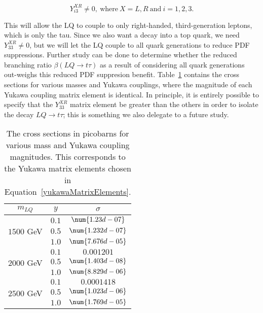         \begin{equation}
            Y^{XR}_{i3} \neq 0,\ \text{where}\ X=L,R\ \text{and}\ i=1,2,3.
        \end{equation}\label{yukawaMatrixElements}

         This will allow the LQ to couple to only right-handed, third-generation leptons, which is only the tau. Since we also want a decay into a top quark, we need $Y^{XR}_{33} \neq 0$, but we will let the LQ couple to all quark generations to reduce PDF suppressions. Further study can be done to determine whether the reduced branching ratio $\beta(LQ \rightarrow t\tau)$ as a result of considering all quark generations out-weighs this reduced PDF suppresion benefit. Table~\ref{crossSections} contains the cross sections for various masses and Yukawa couplings, where the magnitude of each Yukawa coupling matrix element is identical. In principle, it is entirely possible to specify that the $Y^{XR}_{33}$ matrix element be greater than the others in order to isolate the decay $LQ \rightarrow t\tau$; this is something we also delegate to a future study.

        \renewcommand{\arraystretch}{1.15}
        \begin{table}[tbh]
            \centering
            \begin{tabular}{c|c|c}
                $m_{LQ}$ & $y$ & $\sigma$ \\ \hline
                \multirow{3}{5em}{$1500$ GeV} & $0.1$ & $\num{1.23d-07}$ \\ \cline{2-3}
                & $0.5$ & $\num{1.232d-07}$ \\ \cline{2-3}
                & $1.0$ & $\num{7.676d-05}$ \\ \hline
                \multirow{3}{5em}{$2000$ GeV} & $0.1$ & $\num{0.001201}$ \\ \cline{2-3}
                & $0.5$ & $\num{1.403d-08}$ \\ \cline{2-3}
                & $1.0$ & $\num{8.829d-06}$ \\ \hline
                \multirow{3}{5em}{$2500$ GeV} & $0.1$ & $\num{0.0001418}$ \\ \cline{2-3}
                & $0.5$ & $\num{1.023d-06}$ \\ \cline{2-3}
                & $1.0$ & $\num{1.769d-05}$ \\ \hline
            \end{tabular}
            \caption{The cross sections in picobarns for various mass and Yukawa coupling magnitudes. This corresponds to the Yukawa matrix elements chosen in Equation~\eqref{yukawaMatrixElements}.}
            \label{crossSections}
        \end{table}
        \renewcommand{\arraystretch}{1}

